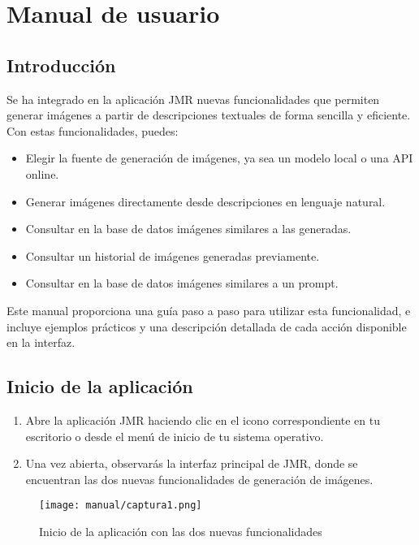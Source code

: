 \section{Manual de usuario}

\subsection{Introducción} 
Se ha integrado en la aplicación JMR nuevas funcionalidades que permiten generar imágenes a partir de descripciones textuales de forma sencilla y eficiente. Con estas funcionalidades, puedes:
\begin{itemize}
    \item Elegir la fuente de generación de imágenes, ya sea un modelo local o una API online.
    \item Generar imágenes directamente desde descripciones en lenguaje natural.
    \item Consultar en la base de datos imágenes similares a las generadas.
    \item Consultar un historial de imágenes generadas previamente.
    \item Consultar en la base de datos imágenes similares a un prompt.
\end{itemize}

Este manual proporciona una guía paso a paso para utilizar esta funcionalidad, e incluye ejemplos prácticos y una descripción detallada de cada acción disponible en la interfaz.

\subsection{Inicio de la aplicación}
\begin{enumerate}
    \item Abre la aplicación JMR haciendo clic en el icono correspondiente en tu escritorio o desde el menú de inicio de tu sistema operativo.
    \item Una vez abierta, observarás la interfaz principal de JMR, donde se encuentran las dos nuevas funcionalidades de generación de imágenes.
\end{enumerate}

\begin{figure}[H]
    \centering
    \texttt{[image: manual/captura1.png]}
    \caption{Inicio de la aplicación con las dos nuevas funcionalidades}
    \label{fig:inicio}
\end{figure}

